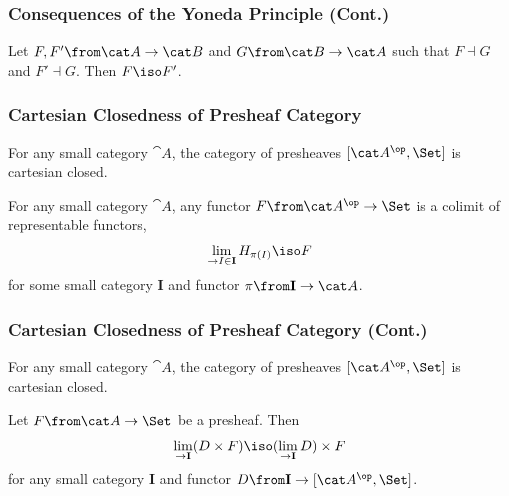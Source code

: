 \documentclass{beamer}
\begin{document}
\begin{frame}
  \frametitle{Consequences of the Yoneda Principle (Cont.)}
  \begin{theorem}
    Let $F,F'\from \cat A\to\cat B$ and $G\from\cat B\to\cat A$ such that $F\dashv G$ and $F'\dashv G$. Then $F\iso F'$.
  \end{theorem}
\end{frame}

\begin{frame}
  \frametitle{Cartesian Closedness of Presheaf Category}
  \begin{theorem}
    For any small category $\cat A$, the category of presheaves $[\cat A^\op,\Set]$ is cartesian closed.
  \end{theorem}
  \pause
  \begin{lemma}
    For any small category $\cat A$, any functor $F\from\cat A^\op\to\Set$ is a colimit of representable functors,
    \begin{align*}
      \lim_{\to I\in\mathbf I} H_{\pi(I)}\iso F
    \end{align*}
    for some small category $\mathbf I$ and functor $\pi\from \mathbf I\to \cat A$.
  \end{lemma}
\end{frame}

\begin{frame}
  \frametitle{Cartesian Closedness of Presheaf Category (Cont.)}  
  \begin{theorem}
    For any small category $\cat A$, the category of presheaves $[\cat A^\op,\Set]$ is cartesian closed.
  \end{theorem}
  \pause
  \begin{lemma}
    Let $F\from \cat A\to\Set$ be a presheaf. Then
    \begin{align*}
      \lim_{\to \mathbf I} (D\times F)\iso (\lim_{\to \mathbf I} D)\times F
    \end{align*}
    for any small category $\mathbf I$ and functor $D\from\mathbf I\to [\cat A^\op,\Set]$.
  \end{lemma}
\end{frame}
\end{document}
